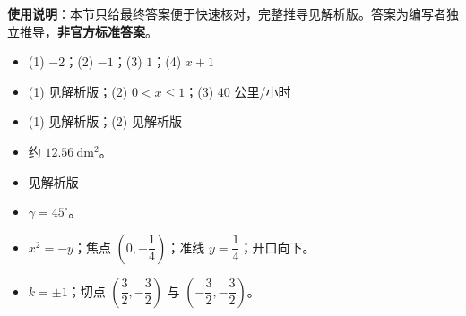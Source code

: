
\begin{gknotice}
\textbf{使用说明}：本节只给最终答案便于快速核对，完整推导见解析版。答案为编写者独立推导，\textbf{非官方标准答案}。
\end{gknotice}

\begin{itemize}[leftmargin=2.6em]
  \item[\textbf{1.}] (1) $-2$；(2) $-1$；(3) $1$；(4) $x+1$
  \item[\textbf{2.}] (1) 见解析版；(2) $0<x\le1$；(3) $40$ 公里/小时
  \item[\textbf{3.}] (1) 见解析版；(2) 见解析版
  \item[\textbf{4.}] 约 $12.56\ \mathrm{dm^2}$。
  \item[\textbf{5.}] 见解析版
  \item[\textbf{6.}] $\gamma=45^\circ$。
  \item[\textbf{7.}] $x^2=-y$；焦点 $\left(0,-\dfrac14\right)$；准线 $y=\dfrac14$；开口向下。
  \item[\textbf{8.}] $k=\pm1$；切点 $\left(\dfrac32,-\dfrac32\right)$ 与 $\left(-\dfrac32,-\dfrac32\right)$。
\end{itemize}
